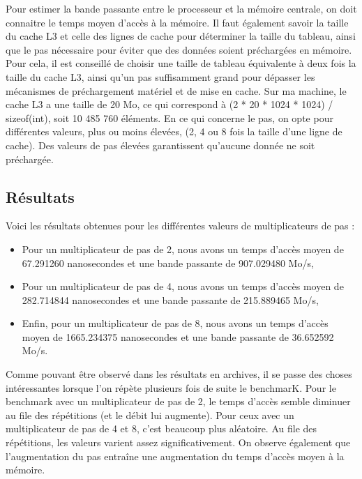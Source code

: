 \documentclass{rapport}
\begin{document}
            Pour estimer la bande passante entre le processeur et la mémoire centrale, on doit connaitre le temps moyen d'accès à la mémoire. Il faut également savoir la taille du cache L3 et celle des lignes de cache pour déterminer la taille du tableau, ainsi que le pas nécessaire pour éviter que des données soient préchargées en mémoire. Pour cela, il est conseillé de choisir une taille de tableau équivalente à deux fois la taille du cache L3, ainsi qu’un pas suffisamment grand pour dépasser les mécanismes de préchargement matériel et de mise en cache. Sur ma machine, le cache L3 a une taille de 20 Mo, ce qui correspond à (2 * 20 * 1024 * 1024) / sizeof(int), soit 10 485 760 éléments. En ce qui concerne le pas, on opte pour différentes valeurs, plus ou moins élevées, (2, 4 ou 8 fois la taille d’une ligne de cache). Des valeurs de pas élevées garantissent qu’aucune donnée ne soit préchargée. \\[2mm]

            \subsection{Résultats}

            Voici les résultats obtenues pour les différentes valeurs de multiplicateurs de pas :
            
            \begin{itemize}
            \item Pour un multiplicateur de pas de 2, nous avons un temps d'accès moyen de 67.291260 nanosecondes et une bande passante de 907.029480 Mo/s,
            \item Pour un multiplicateur de pas de 4, nous avons un temps d'accès moyen de 282.714844 nanosecondes et une bande passante de 215.889465 Mo/s,
            \item Enfin, pour un multiplicateur de pas de 8, nous avons un temps d'accès moyen de 1665.234375 nanosecondes et une bande passante de 36.652592 Mo/s.
            \end{itemize}
            Comme pouvant être observé dans les résultats en archives, il se passe des choses intéressantes lorsque l'on répète plusieurs fois de suite le benchmarK. Pour le benchmark avec un multiplicateur de pas de 2, le temps d'accès semble diminuer au file des répétitions (et le débit lui augmente).
            Pour ceux avec un multiplicateur de pas de 4 et 8, c'est beaucoup plus aléatoire. Au file des répétitions, les valeurs varient assez significativement.
            On observe également que l’augmentation du pas entraîne une augmentation du temps d’accès moyen à la mémoire.
            
\end{document}
